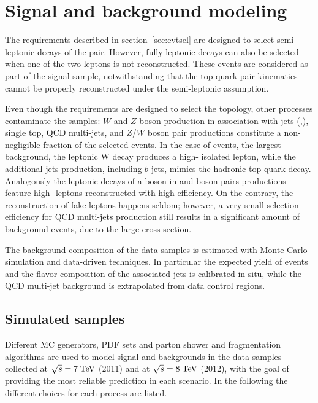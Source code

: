 \section{Signal and background modeling}
\label{sec:bckgmodel}

The requirements described in section~\ref{sec:evtsel} are designed to
select semi-leptonic decays of the \ttbar{} pair. However, fully
leptonic decays can also be selected when one of the two leptons is not
reconstructed. These events are considered as part of the signal
sample, notwithstanding that the top quark pair kinematics cannot be
properly reconstructed under the semi-leptonic assumption.

Even though the requirements are designed to select the \ttbar{}
topology, other processes contaminate the samples: $W$ and $Z$ boson
production in association with jets (\wjets{},\zjets{}), single top,
QCD multi-jets, and $Z$/$W$ boson pair productions constitute a non-negligible
fraction of the selected events.
In the case of \wjets{} events, the largest background, the leptonic W
decay produces a high-\pt{} isolated lepton, while the additional jets
production, including $b$-jets, mimics the hadronic top quark decay.
Analogously the leptonic decays of a boson in \zjets{} and boson pairs
productions feature high-\pt{} leptons reconstructed with high
efficiency.
On the contrary, the reconstruction of fake leptons happens seldom;
however, a very small selection efficiency for QCD multi-jets
production still results in a significant amount of background
events, due to the large cross section.

The background composition of the data samples is estimated with Monte
Carlo simulation and data-driven techniques. In particular the
expected yield of \wjets{} events and the flavor composition of the
associated jets is calibrated in-situ, while the QCD
multi-jet background is extrapolated from data control regions.

\subsection{Simulated samples}
\label{sec:mcsamples}

Different MC generators, PDF sets and parton shower and fragmentation
algorithms are used to model signal and backgrounds in the data
samples collected at $\sqrt{s} = 7 \; \mathrm{TeV}{}$ (2011) and at $\sqrt{s} = 8
\; \mathrm{TeV}{}$ (2012), with the goal of providing the most reliable
prediction in each scenario. In the following the different choices
for each process are listed.

